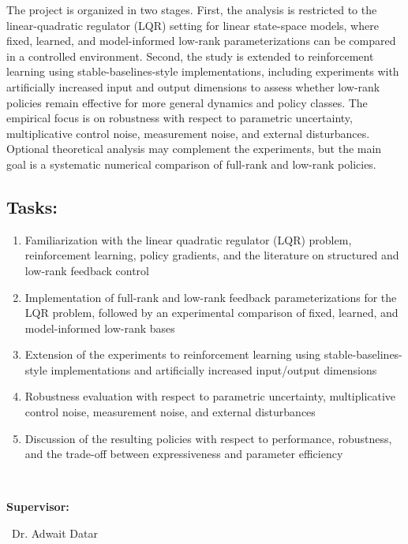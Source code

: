\documentclass[a4paper,11pt]{article}
\begin{document}
The project is organized in two stages. First, the analysis is restricted to the linear-quadratic regulator (LQR) setting for linear state-space models, where fixed, learned, and model-informed low-rank parameterizations can be compared in a controlled environment. Second, the study is extended to reinforcement learning using stable-baselines-style implementations, including experiments with artificially increased input and output dimensions to assess whether low-rank policies remain effective for more general dynamics and policy classes. The empirical focus is on robustness with respect to parametric uncertainty, multiplicative control noise, measurement noise, and external disturbances. Optional theoretical analysis may complement the experiments, but the main goal is a systematic numerical comparison of full-rank and low-rank policies.

\subsection*{Tasks:}
\begin{enumerate}
    \setlength\itemsep{-0.4em}
    \item Familiarization with the linear quadratic regulator (LQR) problem, reinforcement learning, policy gradients, and the literature on structured and low-rank feedback control \cite{anderson2019system,park2020structured,takakura2022structured}
    \item Implementation of full-rank and low-rank feedback parameterizations for the LQR problem, followed by an experimental comparison of fixed, learned, and model-informed low-rank bases
    \item Extension of the experiments to reinforcement learning using stable-baselines-style implementations and artificially increased input/output dimensions
    \item Robustness evaluation with respect to parametric uncertainty, multiplicative control noise, measurement noise, and external disturbances
    \item Discussion of the resulting policies with respect to performance, robustness, and the trade-off between expressiveness and parameter efficiency
\end{enumerate}
\small{}


\hspace{0.1cm}\\
\begin{minipage}{0.12\textwidth}
	\large{\textbf{Supervisor:}}
\end{minipage}
\begin{minipage}{0.88\textwidth}
	\hspace{1cm}\
	Dr. Adwait Datar
\end{minipage}
\end{document}
